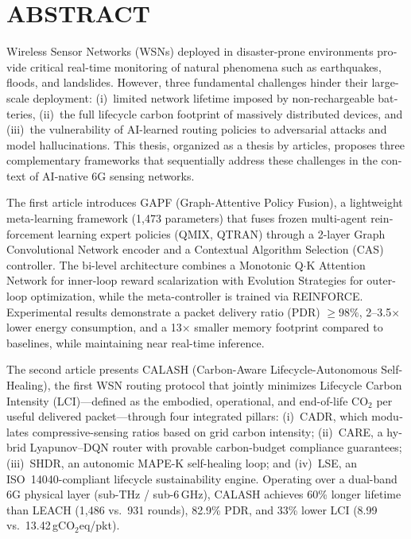 
\chapter*{ABSTRACT}\thispagestyle{headings}
%
\begin{otherlanguage}{english}

Wireless Sensor Networks (WSNs) deployed in disaster-prone environments provide critical real-time monitoring of natural phenomena such as earthquakes, floods, and landslides. However, three fundamental challenges hinder their large-scale deployment: (i)~limited network lifetime imposed by non-rechargeable batteries, (ii)~the full lifecycle carbon footprint of massively distributed devices, and (iii)~the vulnerability of AI-learned routing policies to adversarial attacks and model hallucinations. This thesis, organized as a thesis by articles, proposes three complementary frameworks that sequentially address these challenges in the context of AI-native 6G sensing networks.

The first article introduces GAPF (Graph-Attentive Policy Fusion), a lightweight meta-learning framework (1,473 parameters) that fuses frozen multi-agent reinforcement learning expert policies (QMIX, QTRAN) through a 2-layer Graph Convolutional Network encoder and a Contextual Algorithm Selection (CAS) controller. The bi-level architecture combines a Monotonic Q$\cdot$K Attention Network for inner-loop reward scalarization with Evolution Strategies for outer-loop optimization, while the meta-controller is trained via REINFORCE. Experimental results demonstrate a packet delivery ratio (PDR) $\geq 98\%$, 2--3.5$\times$ lower energy consumption, and a 13$\times$ smaller memory footprint compared to baselines, while maintaining near real-time inference.

The second article presents CALASH (Carbon-Aware Lifecycle-Autonomous Self-Healing), the first WSN routing protocol that jointly minimizes Lifecycle Carbon Intensity (LCI)---defined as the embodied, operational, and end-of-life CO$_2$ per useful delivered packet---through four integrated pillars: (i)~CADR, which modulates compressive-sensing ratios based on grid carbon intensity; (ii)~CARE, a hybrid Lyapunov--DQN router with provable carbon-budget compliance guarantees; (iii)~SHDR, an autonomic MAPE-K self-healing loop; and (iv)~LSE, an ISO~14040-compliant lifecycle sustainability engine. Operating over a dual-band 6G physical layer (sub-THz / sub-6\,GHz), CALASH achieves 60\% longer lifetime than LEACH (1,486 vs.\ 931 rounds), 82.9\% PDR, and 33\% lower LCI (8.99 vs.\ 13.42\,gCO$_2$eq/pkt).


\end{otherlanguage}
